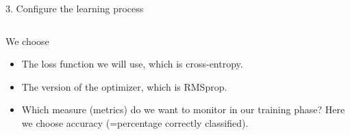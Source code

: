 \documentclass[10pt,ignorenonframetext,]{beamer}
\newenvironment{Shaded}{\begin{snugshade}}{\end{snugshade}}
\newcommand{\DataTypeTok}[1]{\textcolor[rgb]{0.13,0.29,0.53}{#1}}
\newcommand{\KeywordTok}[1]{\textcolor[rgb]{0.13,0.29,0.53}{\textbf{#1}}}
\newcommand{\NormalTok}[1]{#1}
\newcommand{\OperatorTok}[1]{\textcolor[rgb]{0.81,0.36,0.00}{\textbf{#1}}}
\newcommand{\StringTok}[1]{\textcolor[rgb]{0.31,0.60,0.02}{#1}}
\begin{document}
\begin{frame}[fragile]

\begin{block}{3. Configure the learning process}

\(~\)

We choose

\vspace{2mm}

\begin{itemize}
\item
  The loss function we will use, which is cross-entropy.
\item
  The version of the optimizer, which is RMSprop.
\item
  Which measure (metrics) do we want to monitor in our training phase?
  Here we choose accuracy (=percentage correctly classified).
\end{itemize}

\(~\)

\scriptsize

\begin{Shaded}
\end{Shaded}

\end{block}

\end{frame}
\end{document}
